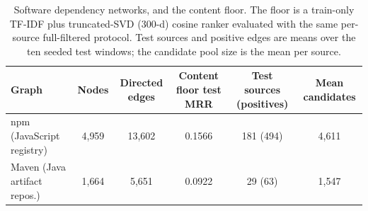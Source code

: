 \begin{table}[t]
\caption{Software dependency networks, and the content floor. The floor is a train-only
TF-IDF plus truncated-SVD (300-d) cosine ranker evaluated with the same per-source
full-filtered protocol. Test sources and positive edges are means over the ten seeded test
windows; the candidate pool size is the mean per source.}
\label{tab:datasets}
\begin{tabular}{lccccc}
\toprule
Graph & Nodes & Directed edges & Content floor test MRR & Test sources (positives) & Mean candidates \\
\midrule
npm (JavaScript registry) & 4{,}959 & 13{,}602 & 0.1566 & 181 (494) & 4{,}611 \\
Maven (Java artifact repos.) & 1{,}664 & 5{,}651 & 0.0922 & 29 (63) & 1{,}547 \\
\bottomrule
\end{tabular}
\end{table}
